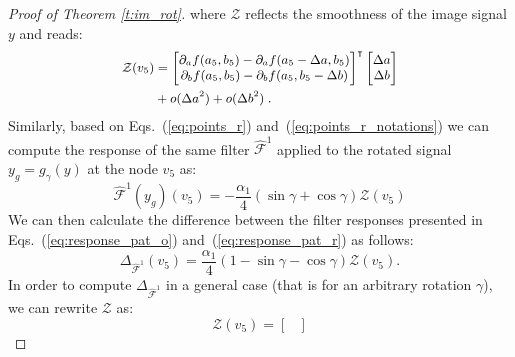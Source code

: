 \documentclass[10pt,journal,compsoc]{IEEEtran}
\newcommand{\hmF}{\hat{\mathcal{F}}}
\begin{document}
\begin{proof}[Proof of Theorem \ref{t:im_rot}]
		\noindent
		where $\mathcal{Z}$ reflects the smoothness of the image signal $y$ and reads:
		\begin{equation}
		\small
		\begin{aligned}
		\mathcal{Z}(v_5) & =
		\begin{bmatrix}
		\partial_a f (a_5, b_5)  - \partial_a f (a_5-\Delta a, b_5)\\
		\partial_b f (a_5,b_5)  - \partial_b f (a_5,b_5-\Delta b)\\
		\end{bmatrix}^{\intercal}
		\begin{bmatrix}
		\Delta a \\
		\Delta b \\
		\end{bmatrix} \\
		 & + o(\Delta a^2) + o(\Delta b^2)\;.
		\end{aligned}
		\end{equation}
		\noindent
		Similarly, based on Eqs.~(\ref{eq:points_r}) and~(\ref{eq:points_r_notations}) we can compute the response of the same filter $\hmF^1$ applied to the rotated signal $y_g = g_{\gamma}(y)$ at the node $v_5$ as:
		\begin{equation}
		\hmF^{1}(y_g)(v_5) = - \frac{\alpha_1}{4} (\sin\gamma + \cos\gamma) \mathcal{Z}(v_5)
		\label{eq:response_pat_r}
		\end{equation}
		\noindent
		We can then calculate the difference between the filter responses presented in Eqs.~(\ref{eq:response_pat_o}) and~(\ref{eq:response_pat_r}) as follows:
		\begin{equation}
		\Delta_{\hmF^1}(v_5) = \frac{\alpha_1}{4} (1 - \sin\gamma - \cos\gamma) \mathcal{Z}(v_5).
		\label{eq:diff_resp}
		\end{equation}
		In order to compute $\Delta_{\hmF^1}$ in a general case (that is for an arbitrary rotation $\gamma$), we can rewrite $\mathcal{Z}$ as:
		\begin{equation}
		\mathcal{Z}(v_5) =
		\begin{bmatrix}

\end{bmatrix}
\end{equation}
\end{proof}
\end{document}
